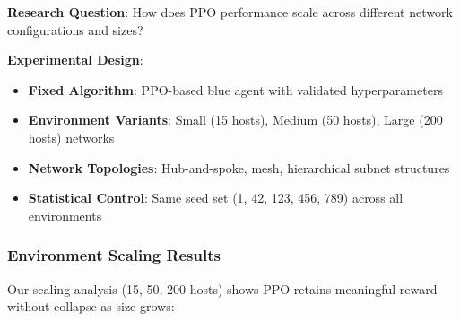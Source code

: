 \documentclass[12pt]{article}
\theoremstyle{definition}
\theoremstyle{plain}
\begin{document}
\textbf{Research Question}: How does PPO performance scale across different network configurations and sizes?

\textbf{Experimental Design}:
\begin{itemize}
\item \textbf{Fixed Algorithm}: PPO-based blue agent with validated hyperparameters
\item \textbf{Environment Variants}: Small (15 hosts), Medium (50 hosts), Large (200 hosts) networks
\item \textbf{Network Topologies}: Hub-and-spoke, mesh, hierarchical subnet structures
\item \textbf{Statistical Control}: Same seed set (1, 42, 123, 456, 789) across all environments
\end{itemize}

\subsubsection{Environment Scaling Results}

Our scaling analysis (15, 50, 200 hosts) shows PPO retains meaningful reward without collapse as size grows:
\end{document}
